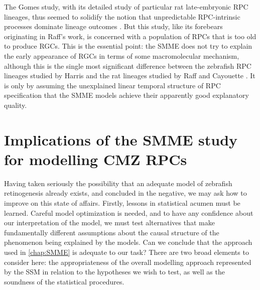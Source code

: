 The Gomes study, with its detailed study of particular rat late-embryonic RPC lineages, thus seemed to solidify the notion that unpredictable RPC-intrinsic processes dominate lineage outcomes \cite{Gomes2011}. But this study, like its forebears originating in Raff's work, is concerned with a population of RPCs that is too old to produce RGCs. This is the essential point: the SMME does not try to explain the early appearance of RGCs in terms of some macromolecular mechanism, although this is the single most significant difference between the zebrafish RPC lineages studied by Harris and the rat lineages studied by Raff and Cayouette \cite{Cayouette2003, Gomes2011}. It is only by assuming the unexplained linear temporal structure of RPC specification that the SMME models achieve their apparently good explanatory quality.

\section{Implications of the SMME study for modelling CMZ RPCs}
Having taken seriously the possibility that an adequate model of zebrafish retinogenesis already exists, and concluded in the negative, we may ask how to improve on this state of affairs. Firstly, lessons in statistical acumen must be learned. Careful model optimization is needed, and to have any confidence about our interpretation of the model, we must test alternatives that make fundamentally different assumptions about the causal structure of the phenomenon being explained by the models. Can we conclude that the approach used in \autoref{chap:SMME} is adequate to our task? There are two broad elements to consider here: the appropriateness of the overall modelling approach represented by the SSM in relation to the hypotheses we wish to test, as well as the soundness of the statistical procedures.


